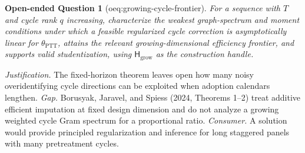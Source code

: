 \documentclass{article}
\newtheorem{openendedquestion}{Open-ended Question}
\begin{document}
\begin{openendedquestion}[oeq:growing-cycle-frontier]\label{oeq:growing-cycle-frontier}
For a sequence with \(T\) and cycle rank \(q\) increasing, characterize the weakest graph-spectrum and moment conditions under which a feasible regularized cycle correction is asymptotically linear for \(\theta_{\mathrm{PTT}}\), attains the relevant growing-dimensional efficiency frontier, and supports valid studentization, using \(\mathsf H_{\mathrm{grow}}\) as the construction handle.
\end{openendedquestion}
\par\smallskip\noindent \textit{Justification.} The fixed-horizon theorem leaves open how many noisy overidentifying cycle directions can be exploited when adoption calendars lengthen. \textit{Gap.} Borusyak, Jaravel, and Spiess (2024, Theorems 1--2) treat additive efficient imputation at fixed design dimension and do not analyze a growing weighted cycle Gram spectrum for a proportional ratio. \textit{Consumer.} A solution would provide principled regularization and inference for long staggered panels with many pretreatment cycles.
\end{document}
